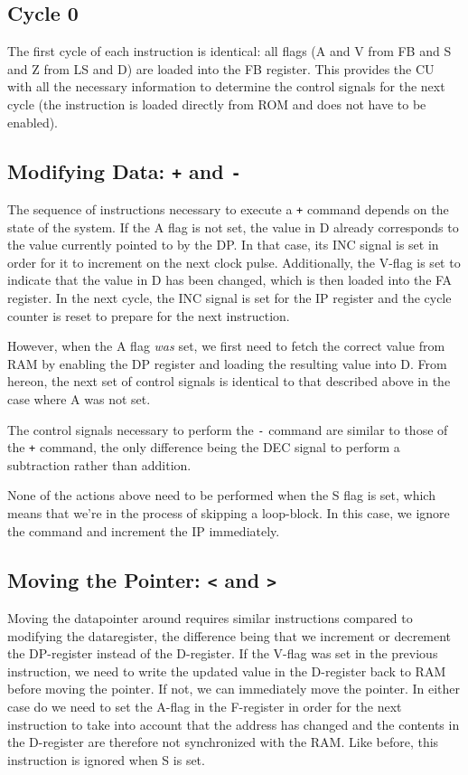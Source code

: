 \subsection{Cycle 0}
The first cycle of each instruction is identical: all flags (A and V from FB and S and Z from LS and D) are loaded into the FB register. This provides the CU with all the necessary information to determine the control signals for the next cycle (the instruction is loaded directly from ROM and does not have to be enabled). 

\subsection{Modifying Data: \texttt{+} and \texttt{-}}
The sequence of instructions necessary to execute a \texttt{+} command depends on the state of the system. If the A flag is not set, the value in D already corresponds to the value currently pointed to by the DP. In that case, its INC signal is set in order for it to increment on the next clock pulse. Additionally, the V-flag is set to indicate that the value in D has been changed, which is then loaded into the FA register. In the next cycle, the INC signal is set for the IP register and the cycle counter is reset to prepare for the next instruction.

However, when the A flag \emph{was} set, we first need to fetch the correct value from RAM by enabling the DP register and loading the resulting value into D. From hereon, the next set of control signals is identical to that described above in the case where A was not set.

The control signals necessary to perform the \texttt{-} command are similar to those of the \texttt{+} command, the only difference being the DEC signal to perform a subtraction rather than addition.

None of the actions above need to be performed when the S flag is set, which means that we're in the process of skipping a loop-block. In this case, we ignore the command and increment the IP immediately.

\subsection{Moving the Pointer: \texttt{<} and \texttt{>}}
Moving the datapointer around requires similar instructions compared to modifying the dataregister, the difference being that we increment or decrement the DP-register instead of the D-register. If the V-flag was set in the previous instruction, we need to write the updated value in the D-register back to RAM before moving the pointer. If not, we can immediately move the pointer. In either case do we need to set the A-flag in the F-register in order for the next instruction to take into account that the address has changed and the contents in the D-register are therefore not synchronized with the RAM. Like before, this instruction is ignored when S is set.

